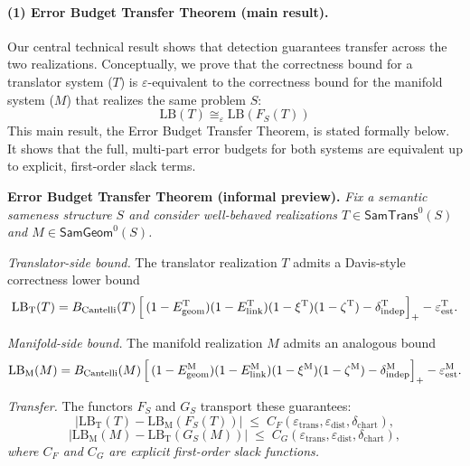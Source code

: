 \documentclass[11pt]{article}
\newcommand{\SamTrans}{\mathsf{SamTrans}}
\newcommand{\SamGeom}{\mathsf{SamGeom}}
\begin{document}
\paragraph{(1) Error Budget Transfer Theorem (main result).}
Our central technical result shows that detection guarantees transfer across the two
realizations. Conceptually, we prove that the correctness bound for a translator system
($T$) is \(\varepsilon\)-equivalent to the correctness bound for the manifold system ($M$)
that realizes the same problem $S$:
%
\begin{equation*}
\mathrm{LB}(T) \cong_{\varepsilon} \mathrm{LB}(F_S(T))
\end{equation*}
%
This main result, the Error Budget Transfer Theorem, is stated formally below. It shows
that the full, multi-part error budgets for both systems are equivalent up to explicit,
first-order slack terms.

\vspace{1ex}
\begin{mdframed}[backgroundcolor=gray!10, linewidth=0.4pt]
\noindent\textbf{Error Budget Transfer Theorem (informal preview).}
\emph{Fix a semantic sameness structure $S$ and consider well-behaved realizations
$T \in \SamTrans^0(S)$ and $M \in \SamGeom^0(S)$.}

\emph{Translator-side bound.} The translator realization $T$ admits a Davis-style correctness
lower bound
\[
\mathrm{LB}_{\mathrm{T}}(T)
= B_{\mathrm{Cantelli}}(T)\,
\Bigl[\,(1-E_{\mathrm{geom}}^{\mathrm{T}})
(1-E_{\mathrm{link}}^{\mathrm{T}})
(1-\xi^{\mathrm{T}})
(1-\zeta^{\mathrm{T}})
- \delta_{\mathrm{indep}}^{\mathrm{T}}\Bigr]_+
- \varepsilon_{\mathrm{est}}^{\mathrm{T}}.
\]

\emph{Manifold-side bound.} The manifold realization $M$ admits an analogous bound
\[
\mathrm{LB}_{\mathrm{M}}(M)
= B_{\mathrm{Cantelli}}(M)\,
\Bigl[\,(1-E_{\mathrm{geom}}^{\mathrm{M}})
(1-E_{\mathrm{link}}^{\mathrm{M}})
(1-\xi^{\mathrm{M}})
(1-\zeta^{\mathrm{M}})
- \delta_{\mathrm{indep}}^{\mathrm{M}}\Bigr]_+
- \varepsilon_{\mathrm{est}}^{\mathrm{M}}.
\]

\emph{Transfer.} The functors $F_S$ and $G_S$ transport these guarantees:
\[
\bigl|\mathrm{LB}_{\mathrm{T}}(T) - \mathrm{LB}_{\mathrm{M}}(F_S(T))\bigr|
\;\le\;
C_F(\varepsilon_{\mathrm{trans}}, \varepsilon_{\mathrm{dist}}, \delta_{\mathrm{chart}}),
\]
\[
\bigl|\mathrm{LB}_{\mathrm{M}}(M) - \mathrm{LB}_{\mathrm{T}}(G_S(M))\bigr|
\;\le\;
C_G(\varepsilon_{\mathrm{trans}}, \varepsilon_{\mathrm{dist}}, \delta_{\mathrm{chart}}),
\]
\emph{where $C_F$ and $C_G$ are explicit first-order slack functions.}
\end{mdframed}
\vspace{1ex}
\end{document}

